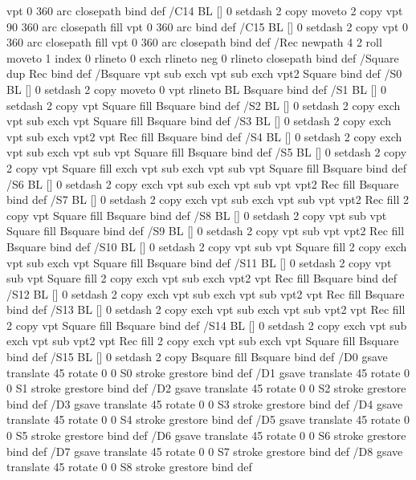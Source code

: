 {{               vpt 0 360 arc closepath } bind def
/C14 { BL [] 0 setdash 2 copy moveto
       2 copy  vpt 90 360 arc closepath fill
               vpt 0 360 arc } bind def
/C15 { BL [] 0 setdash 2 copy vpt 0 360 arc closepath fill
               vpt 0 360 arc closepath } bind def
/Rec   { newpath 4 2 roll moveto 1 index 0 rlineto 0 exch rlineto
       neg 0 rlineto closepath } bind def
/Square { dup Rec } bind def
/Bsquare { vpt sub exch vpt sub exch vpt2 Square } bind def
/S0 { BL [] 0 setdash 2 copy moveto 0 vpt rlineto BL Bsquare } bind def
/S1 { BL [] 0 setdash 2 copy vpt Square fill Bsquare } bind def
/S2 { BL [] 0 setdash 2 copy exch vpt sub exch vpt Square fill Bsquare } bind def
/S3 { BL [] 0 setdash 2 copy exch vpt sub exch vpt2 vpt Rec fill Bsquare } bind def
/S4 { BL [] 0 setdash 2 copy exch vpt sub exch vpt sub vpt Square fill Bsquare } bind def
/S5 { BL [] 0 setdash 2 copy 2 copy vpt Square fill
       exch vpt sub exch vpt sub vpt Square fill Bsquare } bind def
/S6 { BL [] 0 setdash 2 copy exch vpt sub exch vpt sub vpt vpt2 Rec fill Bsquare } bind def
/S7 { BL [] 0 setdash 2 copy exch vpt sub exch vpt sub vpt vpt2 Rec fill
       2 copy vpt Square fill
       Bsquare } bind def
/S8 { BL [] 0 setdash 2 copy vpt sub vpt Square fill Bsquare } bind def
/S9 { BL [] 0 setdash 2 copy vpt sub vpt vpt2 Rec fill Bsquare } bind def
/S10 { BL [] 0 setdash 2 copy vpt sub vpt Square fill 2 copy exch vpt sub exch vpt Square fill
       Bsquare } bind def
/S11 { BL [] 0 setdash 2 copy vpt sub vpt Square fill 2 copy exch vpt sub exch vpt2 vpt Rec fill
       Bsquare } bind def
/S12 { BL [] 0 setdash 2 copy exch vpt sub exch vpt sub vpt2 vpt Rec fill Bsquare } bind def
/S13 { BL [] 0 setdash 2 copy exch vpt sub exch vpt sub vpt2 vpt Rec fill
       2 copy vpt Square fill Bsquare } bind def
/S14 { BL [] 0 setdash 2 copy exch vpt sub exch vpt sub vpt2 vpt Rec fill
       2 copy exch vpt sub exch vpt Square fill Bsquare } bind def
/S15 { BL [] 0 setdash 2 copy Bsquare fill Bsquare } bind def
/D0 { gsave translate 45 rotate 0 0 S0 stroke grestore } bind def
/D1 { gsave translate 45 rotate 0 0 S1 stroke grestore } bind def
/D2 { gsave translate 45 rotate 0 0 S2 stroke grestore } bind def
/D3 { gsave translate 45 rotate 0 0 S3 stroke grestore } bind def
/D4 { gsave translate 45 rotate 0 0 S4 stroke grestore } bind def
/D5 { gsave translate 45 rotate 0 0 S5 stroke grestore } bind def
/D6 { gsave translate 45 rotate 0 0 S6 stroke grestore } bind def
/D7 { gsave translate 45 rotate 0 0 S7 stroke grestore } bind def
/D8 { gsave translate 45 rotate 0 0 S8 stroke grestore } bind def
}

